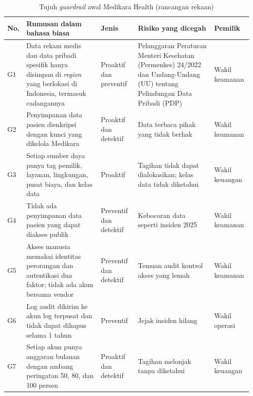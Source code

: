 \begin{table}[!htb]
  \centering
  \caption{Tujuh \textit{guardrail} awal Medikara Health (rancangan rekaan)}
  \label{tab:ch14-katalog-guardrail}
  \footnotesize
  \begin{tabularx}{\textwidth}{>{\raggedright\arraybackslash}p{0.6cm}
      >{\raggedright\arraybackslash}X >{\raggedright\arraybackslash}p{1.7cm}
      >{\raggedright\arraybackslash}X >{\raggedright\arraybackslash}p{1.6cm}}
    \hline
    \textbf{No.} & \textbf{Rumusan dalam bahasa biasa} & \textbf{Jenis} & \textbf{Risiko yang
      dicegah} & \textbf{Pemilik} \\ \hline
    G1 & Data rekam medis dan data pribadi spesifik hanya disimpan di \textit{region} yang berlokasi
      di Indonesia, termasuk cadangannya & Proaktif dan preventif & Pelanggaran Peraturan Menteri
      Kesehatan (Permenkes) 24/2022 dan Undang-Undang (UU) tentang Pelindungan Data Pribadi (PDP) &
      Wakil keamanan \\ \hline
    G2 & Penyimpanan data pasien dienkripsi dengan kunci yang dikelola Medikara & Proaktif dan
      detektif & Data terbaca pihak yang tidak berhak & Wakil keamanan \\ \hline
    G3 & Setiap sumber daya punya tag pemilik, layanan, lingkungan, pusat biaya, dan kelas data &
      Proaktif & Tagihan tidak dapat dialokasikan; kelas data tidak diketahui & Wakil keuangan \\
      \hline
    G4 & Tidak ada penyimpanan data pasien yang dapat diakses publik & Preventif dan detektif &
      Kebocoran data seperti insiden 2025 & Wakil keamanan \\ \hline
    G5 & Akses manusia memakai identitas perorangan dan autentikasi dua faktor; tidak ada akun
      bersama vendor & Preventif dan detektif & Temuan audit kontrol akses yang lemah & Wakil
      keamanan \\ \hline
    G6 & Log audit dikirim ke akun log terpusat dan tidak dapat dihapus selama 1 tahun & Preventif
      & Jejak insiden hilang & Wakil operasi \\ \hline
    G7 & Setiap akun punya anggaran bulanan dengan ambang peringatan 50, 80, dan 100 persen &
      Proaktif dan detektif & Tagihan melonjak tanpa diketahui & Wakil keuangan \\ \hline
  \end{tabularx}
\end{table}

